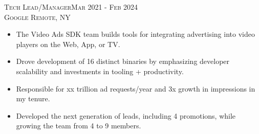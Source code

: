 \textsc{Tech Lead/Manager\hfill Mar 2021 - Feb 2024\\}
\textsc{Google \hfill Remote, NY\\}
\begin{itemize}
	\setlength{\itemsep}{1pt}
	\setlength{\parskip}{0pt}
	\setlength{\parsep}{0pt}
	\setlength{\leftmargin}{-5mm}
  \item The Video Ads SDK team builds tools for integrating advertising into video players on the Web, App, or TV.
  \item Drove development of 16 distinct binaries by emphasizing developer scalability and investments in tooling + productivity.
  \item Responsible for xx trillion ad requests/year and 3x growth in impressions in my tenure.
  \item Developed the next generation of leads, including 4 promotions, while growing the team from 4 to 9 members.
\end{itemize}

\clearpage
  
